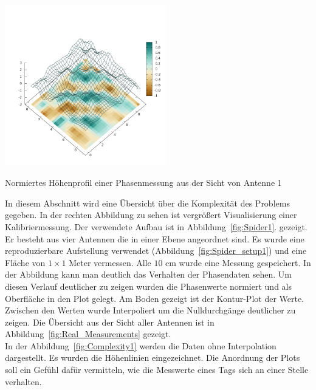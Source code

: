 %
\begin{floatingfigure}[hr!]{6cm}
 \centering
         \includegraphics[width=7cm]{img/Plate0_A1.png}
         \caption[Profil einer Phasenmessung]{Normiertes Höhenprofil einer Phasenmessung aus der Sicht von Antenne 1 }
         \label{fig:Plate0_A1_}
\end{floatingfigure}
%
In diesem Abschnitt wird eine Übersicht über die Komplexität des Problems gegeben. In der rechten Abbildung zu sehen ist vergrößert Visualisierung einer Kalibriermessung. Der verwendete Aufbau ist in Abbildung~\ref{fig:Spider1}. gezeigt. Er besteht aus vier Antennen die in einer Ebene angeordnet sind. Es wurde eine reproduzierbare Aufstellung verwendet (Abbildung~\ref{fig:Spider_setup1}) und eine Fläche von $1\times1$ Meter vermessen. Alle $10$ cm wurde eine Messung gespeichert. In der Abbildung kann man deutlich das Verhalten der Phasendaten sehen. Um diesen Verlauf deutlicher zu zeigen wurden die Phasenwerte normiert und als Oberfläche in den Plot gelegt. Am Boden gezeigt ist der Kontur-Plot der Werte. Zwischen den Werten wurde Interpoliert um die Nulldurchgänge deutlicher zu zeigen. Die Übersicht aus der Sicht aller Antennen ist in Abbildung~\ref{fig:Real_Measurements} gezeigt.\\
%

In der Abbildung~\ref{fig:Complexity1} werden die Daten ohne Interpolation dargestellt. Es wurden die Höhenlinien eingezeichnet. Die Anordnung der Plots soll ein Gefühl dafür vermitteln, wie die Messwerte eines Tags sich an einer Stelle verhalten.\\
%

